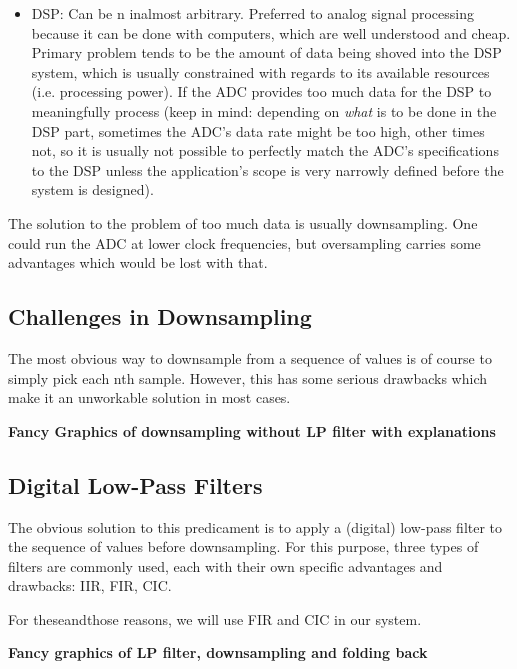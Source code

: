 \documentclass[a4paper,oneside]{alpenthesis/alpenthesis}
\begin{document}
\begin{itemize}
\begin{itemize}
        \end{itemize}
    \item
        DSP: Can be n inalmost arbitrary. Preferred to analog signal processing because
        it can be done with computers, which are well understood and cheap.
        Primary problem tends to be the amount of data being shoved into the DSP
        system, which is usually constrained with regards to its available resources
        (i.e. processing power). If the ADC provides too much data for the DSP to
        meaningfully process (keep in mind: depending on \emph{what} is to be done
        in the DSP part, sometimes the ADC's data rate might be too high, other times
        not, so it is usually not possible to perfectly match the ADC's specifications
        to the DSP unless the application's scope is very narrowly defined before the
        system is designed).
\end{itemize}

The solution to the problem of too much data is usually downsampling. One could run
the ADC at lower clock frequencies, but oversampling carries some advantages which would
be lost with that.

\subsection{Challenges in Downsampling}
\label{subsec:downsampling}

The most obvious way to downsample from a sequence of values is of course to simply pick
each nth sample. However, this has some serious drawbacks which make it an unworkable solution
in most cases.

\textbf{Fancy Graphics of downsampling without LP filter with explanations}


\subsection{Digital Low-Pass Filters}
\label{subsec:digital-lp-filters}

The obvious solution to this predicament is to apply a (digital) low-pass filter to the
sequence of values before downsampling. For this purpose, three types of filters are commonly
used, each with their own specific advantages and drawbacks: IIR, FIR, CIC.

For theseandthose reasons, we will use FIR and CIC in our system.

\textbf{Fancy graphics of LP filter, downsampling and folding back}
\end{document}
